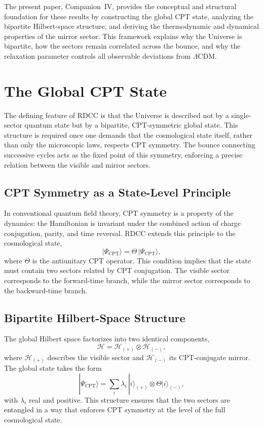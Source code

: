 \documentclass[11pt,a4paper]{article}
\begin{document}
The present paper, Companion~IV, provides the conceptual and structural foundation for these results by constructing the global CPT state, analyzing the bipartite Hilbert-space structure, and deriving the thermodynamic and dynamical properties of the mirror sector. This framework explains why the Universe is bipartite, how the sectors remain correlated across the bounce, and why the relaxation parameter controls all observable deviations from $\Lambda$CDM.

\section{The Global CPT State}

The defining feature of RDCC is that the Universe is described not by a single-sector quantum state but by a bipartite, CPT-symmetric global state. This structure is required once one demands that the cosmological state itself, rather than only the microscopic laws, respects CPT symmetry. The bounce connecting successive cycles acts as the fixed point of this symmetry, enforcing a precise relation between the visible and mirror sectors.

\subsection{CPT Symmetry as a State-Level Principle}

In conventional quantum field theory, CPT symmetry is a property of the dynamics: the Hamiltonian is invariant under the combined action of charge conjugation, parity, and time reversal. RDCC extends this principle to the cosmological state,
\begin{equation}
    |\Psi_{\mathrm{CPT}}\rangle = \Theta\,|\Psi_{\mathrm{CPT}}\rangle,
\end{equation}
where $\Theta$ is the antiunitary CPT operator. This condition implies that the state must contain two sectors related by CPT conjugation. The visible sector corresponds to the forward-time branch, while the mirror sector corresponds to the backward-time branch.

\subsection{Bipartite Hilbert-Space Structure}

The global Hilbert space factorizes into two identical components,
\begin{equation}
    \mathcal{H} = \mathcal{H}_{(+)} \otimes \mathcal{H}_{(-)},
\end{equation}
where $\mathcal{H}_{(+)}$ describes the visible sector and $\mathcal{H}_{(-)}$ its CPT-conjugate mirror. The global state takes the form
\begin{equation}
    |\Psi_{\mathrm{CPT}}\rangle = \sum_i \lambda_i\,|i\rangle_{(+)} \otimes \Theta|i\rangle_{(-)},
\end{equation}
with $\lambda_i$ real and positive. This structure ensures that the two sectors are entangled in a way that enforces CPT symmetry at the level of the full cosmological state.
\end{document}
